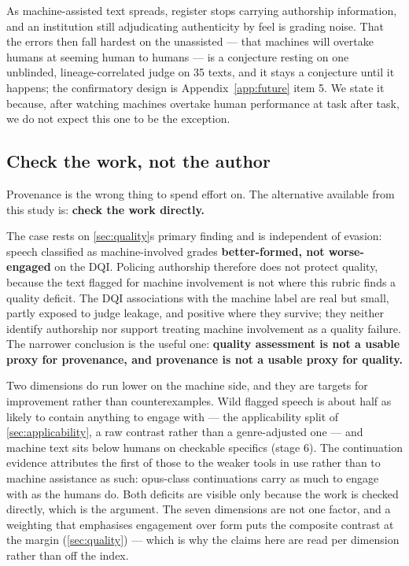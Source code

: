 As machine-assisted text spreads, register stops carrying authorship information, and an institution still adjudicating authenticity by feel is grading noise. That the errors then fall hardest on the unassisted --- that machines will overtake humans at seeming human to humans --- is a conjecture resting on one unblinded, lineage-correlated judge on 35 texts, and it stays a conjecture until it happens; the confirmatory design is Appendix~\ref{app:future} item 5. We state it because, after watching machines overtake human performance at task after task, we do not expect this one to be the exception.

\subsection{Check the work, not the author}\label{sec:disc-substitution}

Provenance is the wrong thing to spend effort on. The alternative available
from this study is: \textbf{check the work directly.}

The case rests on \cref{sec:quality}\textquotesingle s primary finding and is independent of evasion: speech classified as machine-involved grades \textbf{better-formed, not worse-engaged} on the DQI. Policing authorship therefore does not protect quality, because the text flagged for machine involvement is not where this rubric finds a quality deficit. The DQI associations with the machine label are real but small, partly exposed to judge leakage, and positive where they survive; they neither identify authorship nor support treating machine involvement as a quality failure. The narrower conclusion is the useful one: \textbf{quality assessment is not a usable proxy for provenance, and provenance is not a usable proxy for quality.}

Two dimensions do run lower on the machine side, and they are targets for improvement rather than counterexamples. Wild flagged speech is about half as likely to contain anything to engage with --- the applicability split of \cref{sec:applicability}, a raw contrast rather than a genre-adjusted one --- and machine text sits below humans on checkable specifics (stage 6). The continuation evidence attributes the first of those to the weaker tools in use rather than to machine assistance as such: opus-class continuations carry as much to engage with as the humans do. Both deficits are visible only because the work is checked directly, which is the argument. The seven dimensions are not one factor, and a weighting that emphasises engagement over form puts the composite contrast at the margin (\cref{sec:quality}) --- which is why the claims here are read per dimension rather than off the index.

